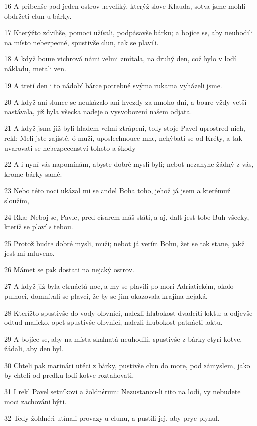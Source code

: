 \par 16 A pribehše pod jeden ostrov neveliký, kterýž slove Klauda, sotva jsme mohli obdržeti clun u bárky.
\par 17 Kterýžto zdvihše, pomoci užívali, podpásavše bárku; a bojíce se, aby neuhodili na místo nebezpecné, spustivše clun, tak se plavili.
\par 18 A když boure vichrová námi velmi zmítala, na druhý den, což bylo v lodí nákladu, metali ven.
\par 19 A tretí den i to nádobí bárce potrebné svýma rukama vyházeli jsme.
\par 20 A když ani slunce se neukázalo ani hvezdy za mnoho dní, a boure vždy vetší nastávala, již byla všecka nadeje o vysvobození našem odjata.
\par 21 A když jsme již byli hladem velmi ztrápeni, tedy stoje Pavel uprostred nich, rekl: Meli jste zajisté, ó muži, uposlechnouce mne, nehýbati se od Kréty, a tak uvarovati se nebezpecenství tohoto a škody
\par 22 A i nyní vás napomínám, abyste dobré mysli byli; nebot nezahyne žádný z vás, krome bárky samé.
\par 23 Nebo této noci ukázal mi se andel Boha toho, jehož já jsem a kterémuž sloužím,
\par 24 Rka: Neboj se, Pavle, pred císarem máš státi, a aj, dalt jest tobe Buh všecky, kteríž se plaví s tebou.
\par 25 Protož budte dobré mysli, muži; nebot já verím Bohu, žet se tak stane, jakž jest mi mluveno.
\par 26 Mámet se pak dostati na nejaký ostrov.
\par 27 A když již byla ctrnáctá noc, a my se plavili po mori Adriatickém, okolo pulnoci, domnívali se plavci, že by se jim okazovala krajina nejaká.
\par 28 Kterížto spustivše do vody olovnici, nalezli hlubokost dvadcíti loktu; a odjevše odtud malicko, opet spustivše olovnici, nalezli hlubokost patnácti loktu.
\par 29 A bojíce se, aby na místa skalnatá neuhodili, spustivše z bárky ctyri kotve, žádali, aby den byl.
\par 30 Chteli pak marinári utéci z bárky, pustivše clun do more, pod zámyslem, jako by chteli od predku lodí kotve roztahovati,
\par 31 I rekl Pavel setníkovi a žoldnérum: Nezustanou-li tito na lodí, vy nebudete moci zachováni býti.
\par 32 Tedy žoldnéri utínali provazy u clunu, a pustili jej, aby pryc plynul.
